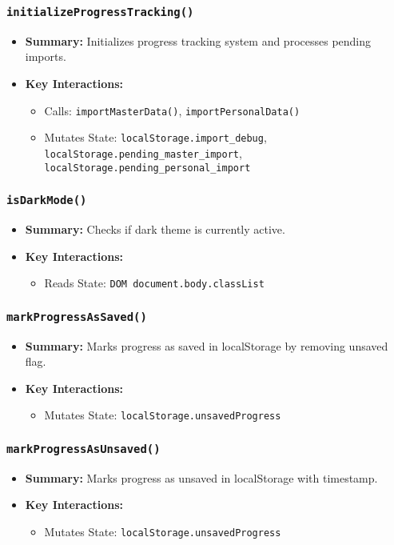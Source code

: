 \documentclass[11pt,letterpaper]{article}
\begin{document}
\subsubsection{\texttt{initializeProgressTracking()}}
\begin{itemize}
    \item \textbf{Summary:} Initializes progress tracking system and processes pending imports.
    \item \textbf{Key Interactions:}
    \begin{itemize}
        \item Calls: \texttt{importMasterData()}, \texttt{importPersonalData()}
        \item Mutates State: \texttt{localStorage.import\_debug}, \texttt{localStorage.pending\_master\_import}, \texttt{localStorage.pending\_personal\_import}
    \end{itemize}
\end{itemize}

\subsubsection{\texttt{isDarkMode()}}
\begin{itemize}
    \item \textbf{Summary:} Checks if dark theme is currently active.
    \item \textbf{Key Interactions:}
    \begin{itemize}
        \item Reads State: \texttt{DOM document.body.classList}
    \end{itemize}
\end{itemize}

\subsubsection{\texttt{markProgressAsSaved()}}
\begin{itemize}
    \item \textbf{Summary:} Marks progress as saved in localStorage by removing unsaved flag.
    \item \textbf{Key Interactions:}
    \begin{itemize}
        \item Mutates State: \texttt{localStorage.unsavedProgress}
    \end{itemize}
\end{itemize}

\subsubsection{\texttt{markProgressAsUnsaved()}}
\begin{itemize}
    \item \textbf{Summary:} Marks progress as unsaved in localStorage with timestamp.
    \item \textbf{Key Interactions:}
    \begin{itemize}
        \item Mutates State: \texttt{localStorage.unsavedProgress}
    \end{itemize}
\end{itemize}
\end{document}
